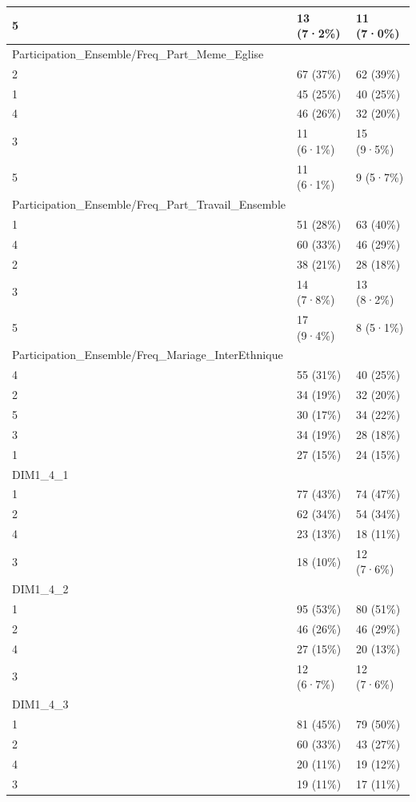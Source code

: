 \documentclass[
]{book}
\begin{document}
\begin{tabular}{l|l|l}
\hline
5 & 13 (7·2\%) & 11 (7·0\%)\\
\hline
Participation\_Ensemble/Freq\_Part\_Meme\_Eglise &  & \\
\hline
2 & 67 (37\%) & 62 (39\%)\\
\hline
1 & 45 (25\%) & 40 (25\%)\\
\hline
4 & 46 (26\%) & 32 (20\%)\\
\hline
3 & 11 (6·1\%) & 15 (9·5\%)\\
\hline
5 & 11 (6·1\%) & 9 (5·7\%)\\
\hline
Participation\_Ensemble/Freq\_Part\_Travail\_Ensemble &  & \\
\hline
1 & 51 (28\%) & 63 (40\%)\\
\hline
4 & 60 (33\%) & 46 (29\%)\\
\hline
2 & 38 (21\%) & 28 (18\%)\\
\hline
3 & 14 (7·8\%) & 13 (8·2\%)\\
\hline
5 & 17 (9·4\%) & 8 (5·1\%)\\
\hline
Participation\_Ensemble/Freq\_Mariage\_InterEthnique &  & \\
\hline
4 & 55 (31\%) & 40 (25\%)\\
\hline
2 & 34 (19\%) & 32 (20\%)\\
\hline
5 & 30 (17\%) & 34 (22\%)\\
\hline
3 & 34 (19\%) & 28 (18\%)\\
\hline
1 & 27 (15\%) & 24 (15\%)\\
\hline
DIM1\_4\_1 &  & \\
\hline
1 & 77 (43\%) & 74 (47\%)\\
\hline
2 & 62 (34\%) & 54 (34\%)\\
\hline
4 & 23 (13\%) & 18 (11\%)\\
\hline
3 & 18 (10\%) & 12 (7·6\%)\\
\hline
DIM1\_4\_2 &  & \\
\hline
1 & 95 (53\%) & 80 (51\%)\\
\hline
2 & 46 (26\%) & 46 (29\%)\\
\hline
4 & 27 (15\%) & 20 (13\%)\\
\hline
3 & 12 (6·7\%) & 12 (7·6\%)\\
\hline
DIM1\_4\_3 &  & \\
\hline
1 & 81 (45\%) & 79 (50\%)\\
\hline
2 & 60 (33\%) & 43 (27\%)\\
\hline
4 & 20 (11\%) & 19 (12\%)\\
\hline
3 & 19 (11\%) & 17 (11\%)\\

\end{tabular}
\end{document}
